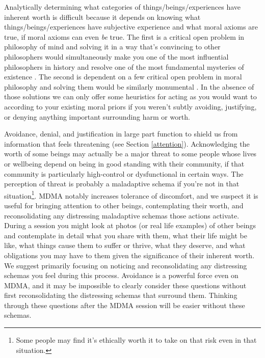 \documentclass[12pt,letterpaper]{book}
\begin{document}
Analytically determining what categories of things/beings/experiences have inherent worth is difficult because it depends on knowing what things/beings/experiences have subjective experience and what moral axioms are true, if moral axioms can even \textit{be} true. The first is a critical open problem in philosophy of mind and solving it in a way that's convincing to other philosophers would simultaneously make you one of the most influential philosophers in history and resolve one of the most fundamental mysteries of existence \cite{hardProblem}. The second is dependent on a few critical open problem in moral philosophy and solving them would be similarly monumental \cite{metaEthics}. In the absence of those solutions we can only offer some heuristics for acting as you would want to according to your existing moral priors if you weren't subtly avoiding, justifying, or denying anything important surrounding harm or worth.

Avoidance, denial, and justification in large part function to shield us from information that feels threatening (see Section \ref{attention}). Acknowledging the worth of some beings may actually be a major threat to some people whose lives or wellbeing depend on being in good standing with their community, if that community is particularly high-control or dysfunctional in certain ways. The perception of threat is probably a maladaptive schema if you're not in that situation\footnote{Some people may find it's ethically worth it to take on that risk even in that situation.}. MDMA notably increases tolerance of discomfort, and we suspect it is useful for bringing attention to other beings, contemplating their worth, and reconsolidating any distressing maladaptive schemas those actions activate. During a session you might look at photos (or real life examples) of other beings and contemplate in detail what you share with them, what their life might be like, what things cause them to suffer or thrive, what they deserve, and what obligations you may have to them given the significance of their inherent worth. We suggest primarily focusing on noticing and reconsolidating any distressing schemas you feel during this process. Avoidance is a powerful force even on MDMA, and it may be impossible to clearly consider these questions without first reconsolidating the distressing schemas that surround them. Thinking through these questions after the MDMA session will be easier without these schemas.
\end{document}
